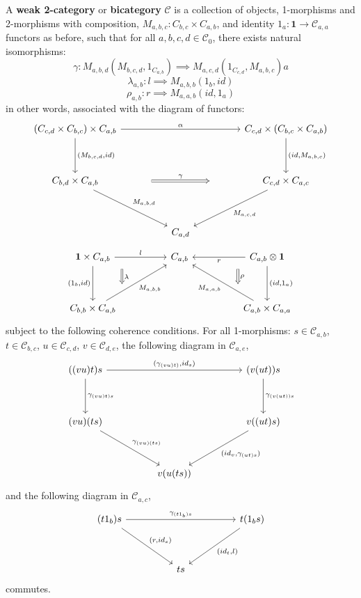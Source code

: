 \begin{defn}\label{bicat}
  A \textbf{weak 2-category} or \textbf{bicategory} $\mathcal{C}$ is a collection of objects, 1-morphisms and 2-morphisms with composition, $M_{a, b, c} : C_{b,c} \times C_{a,b}$, and identity $1_a : \mathbf{1} \to \mathcal{C}_{a,a}$ functors as before, such that for all $a, b, c, d \in \mathcal{C}_0$, there exists natural isomorphisms:
  \[
    \gamma :  M_{a,b,d} (M_{b,c,d}, 1_{C_{a,b}}) \implies M_{a, c, d}(1_{C_{c, d}}, M_{a, b, c}) a
  \]
  \[
    \lambda_{a,b} : l \implies M_{a, b, b} (1_b, id)
  \]
  \[
    \rho_{a,b} : r \implies M_{a, a, b}(id, 1_a)
  \]
  in other words, associated with the diagram of functors:
  \[
    \ti
    (C_{c, d} \times C_{b, c}) \times C_{a, b} \ar[d, "{(M_{b, c, d}, id)}"] \ar[rr, "\alpha"] & & C_{c, d} \times (C_{b, c} \times C_{a, b}) \ar[d, "{(id, M_{a, b, c})}"]\\
    C_{b, d} \times C_{a, b} \ar[rd, "M_{a, b, d}"] \ar[rr, "\gamma", Rightarrow, shorten <=50pt,shorten >=50pt]& & C_{c, d} \times C_{a, c} \ar[ld, "M_{a, c, d}"]\\
    & C_{a, d}      &
    \kz
  \]
  \[
    \ti
    \mathbf{1} \times C_{a, b} \ar[d, "{(1_b, id)}", swap] \ar[d, "\lambda", Rightarrow, xshift=30pt, shorten <=10pt,shorten >=10pt, yshift=7pt] \ar[r, "l"] & C_{a, b} & C_{a, b} \otimes \mathbf{1} \ar[l, "r"] \ar[d, "{(id, 1_a)}"] \ar[d, "\rho", Rightarrow, xshift=-30pt, shorten <=10pt,shorten >=10pt, yshift=7pt] \\
    C_{b, b} \times C_{a, b} \ar[ru, "M_{a, b, b}",swap] & & C_{a, b} \times C_{a, a} \ar[lu, "M_{a, a, b}"]
    \kz
  \]
  subject to the following coherence conditions. For all 1-morphisms: $s \in \mathcal{C}_{a,b}$, $t \in \mathcal{C}_{b, c}$, $u \in \mathcal{C}_{c,d}$, $v \in \mathcal{C}_{d,e}$, the following diagram in $\mathcal{C}_{a,e}$,
  \[
    \ti
    ((vu)t)s  \ar[rr, "{(\gamma_{(vu)t)}, id_s)}"] \ar[d, "\gamma_{(vu)t)s}"] & & (v(ut))s \ar[d, "\gamma_{(v(ut))s}"] \\
    (vu)(ts) \ar[dr, "\gamma_{(vu)(ts)}"] & & v((ut)s) \ar[ld, "{(id_v, \gamma_{(ut)s})}"]\\
    & v(u(ts)) & 
    \kz
  \]
  and the following diagram in $\mathcal{C}_{a,c}$,
  \[
    \ti
    (t1_b)s \ar[rr, "\gamma_{(t1_b)s}"] \ar[dr, "{(r,id_s)}"] & & t(1_bs) \ar[ld, "{(id_t, l)}"]\\
    & ts
    \kz
  \]
  commutes.
\end{defn}
